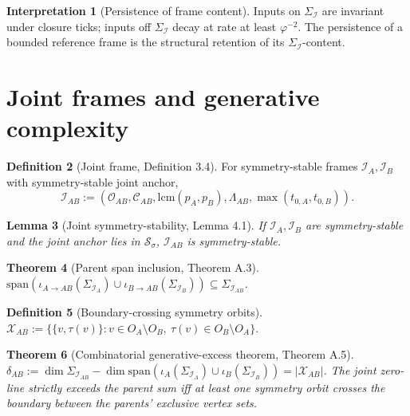\documentclass[11pt]{article}
\theoremstyle{plain}
\newtheorem{theorem}{Theorem}[section]
\newtheorem{lemma}[theorem]{Lemma}
\theoremstyle{definition}
\newtheorem{definition}[theorem]{Definition}
\newtheorem{interpretation}[theorem]{Interpretation}
\theoremstyle{remark}
\newcommand{\Ical}{\mathcal{I}}
\newcommand{\Ocal}{\mathcal{O}}
\newcommand{\Ccal}{\mathcal{C}}
\newcommand{\Xcal}{\mathcal{X}}
\begin{document}
\begin{interpretation}[Persistence of frame content]\label{int:persistence}
Inputs on $\Sigma_\Ical$ are invariant under closure ticks; inputs off $\Sigma_\Ical$ decay at rate at least $\varphi^{-2}$. The persistence of a bounded reference frame is the structural retention of its $\Sigma_\Ical$-content.
\end{interpretation}

\section{Joint frames and generative complexity}\label{sec:joint}

\begin{definition}[Joint frame, \citet{JointObserverInstance} Definition 3.4]\label{def:joint-frame}
For symmetry-stable frames $\Ical_A, \Ical_B$ with symmetry-stable joint anchor,
\[
  \Ical_{AB} := (\Ocal_{AB}, \Ccal_{AB}, \mathrm{lcm}(p_A, p_B), \Lambda_{AB}, \max(t_{0,A}, t_{0,B})).
\]
\end{definition}

\begin{lemma}[Joint symmetry-stability, \citet{JointObserverInstance} Lemma 4.1]\label{lem:joint-sigma}
If $\Ical_A, \Ical_B$ are symmetry-stable and the joint anchor lies in $\mathcal{S}_\sigma$, $\Ical_{AB}$ is symmetry-stable.
\end{lemma}

\begin{theorem}[Parent span inclusion, \citet{JointObserverInstance} Theorem A.3]\label{thm:span-inclusion}
$\mathrm{span}(\iota_{A \to AB}(\Sigma_{\Ical_A}) \cup \iota_{B \to AB}(\Sigma_{\Ical_B})) \subseteq \Sigma_{\Ical_{AB}}$.
\end{theorem}

\begin{definition}[Boundary-crossing symmetry orbits]
$\Xcal_{AB} := \{ \{v, \tau(v)\} : v \in O_A \setminus O_B,\ \tau(v) \in O_B \setminus O_A \}.$
\end{definition}

\begin{theorem}[Combinatorial generative-excess theorem, \citet{JointObserverInstance} Theorem A.5]\label{thm:generative-excess}
$\delta_{AB} := \dim \Sigma_{\Ical_{AB}} - \dim \mathrm{span}(\iota_A(\Sigma_{\Ical_A}) \cup \iota_B(\Sigma_{\Ical_B})) = |\Xcal_{AB}|$. The joint zero-line strictly exceeds the parent sum iff at least one symmetry orbit crosses the boundary between the parents' exclusive vertex sets.
\end{theorem}
\end{document}
